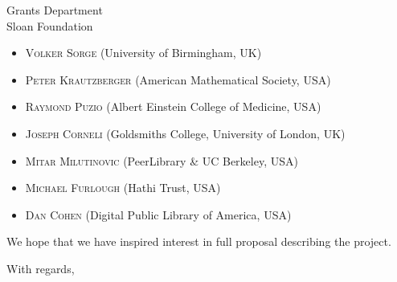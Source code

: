 \documentclass{letter}
\begin{document}
\begin{letter}{Grants Department \\ Sloan Foundation}
\begin{itemize}[label={},itemsep=-5pt]
\item {\scshape Volker Sorge} (University of Birmingham, UK)\\
\item {\scshape Peter Krautzberger} (American Mathematical Society, USA)\\ 
\item {\scshape Raymond Puzio} (Albert Einstein College of Medicine, USA) \\
\item {\scshape Joseph Corneli} (Goldsmiths College, University of London, UK) \\
\item {\scshape Mitar Milutinovic} (PeerLibrary \& UC Berkeley, USA) \\
\item {\scshape Michael Furlough} (Hathi Trust, USA) \\
\item {\scshape Dan Cohen} (Digital Public Library of America, USA)
\end{itemize}

We hope that we have inspired interest in full proposal describing the
project.

\closing{With regards,}
\end{letter}

\end{document}
